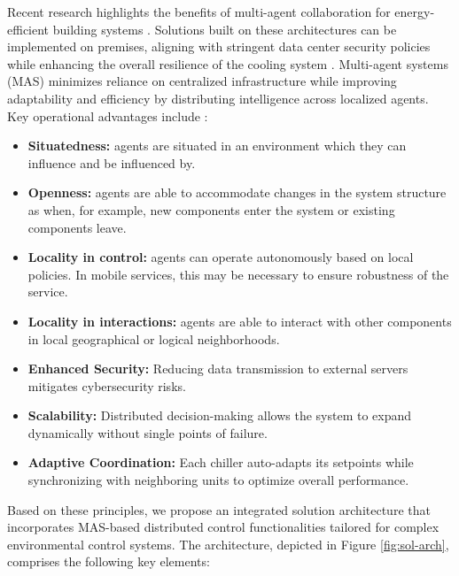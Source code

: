 \documentclass{svproc}
\begin{document}
Recent research highlights the benefits of multi-agent collaboration for energy-efficient building systems \cite{labeodan2015a, qiao2006a}. Solutions built on these architectures can be implemented on premises, aligning with stringent data center security policies while enhancing the overall resilience of the cooling system \cite{yu2022a}. Multi-agent systems (MAS)  minimizes reliance on centralized infrastructure while improving adaptability and efficiency by distributing intelligence across localized agents. Key operational advantages include \cite{koch2005a}:


\begin{itemize} 

\item \textbf{Situatedness:}  agents are situated in an environment which they can influence and be influenced by. 

\item \textbf{Openness:}  agents are able to accommodate changes in the system structure as when, for example, new components enter the system or existing components leave.

\item \textbf{Locality in control:} agents can operate autonomously based on local policies. In mobile services, this may be necessary to ensure robustness of the service.

\item \textbf{Locality in interactions:} agents are able to interact with other components in local geographical or logical neighborhoods.

\item \textbf{Enhanced Security:} Reducing data transmission to external servers mitigates cybersecurity risks.

\item \textbf{Scalability:} Distributed decision-making allows the system to expand dynamically without single points of failure.

\item \textbf{Adaptive Coordination:} Each chiller auto-adapts its setpoints while synchronizing with neighboring units to optimize overall performance.

\end{itemize}


Based on these principles, we propose an integrated solution architecture that incorporates MAS-based distributed control functionalities tailored for complex environmental control systems. The architecture, depicted in Figure \ref{fig:sol-arch}, comprises the following key elements:
\end{document}
